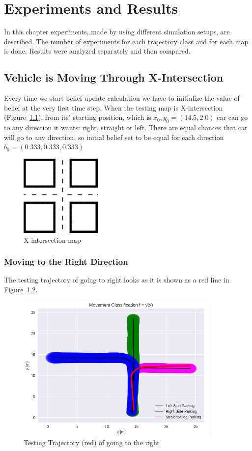 \chapter{Experiments and Results}
\label{chap:4}
%
In this chapter experiments, made by using different simulation setups, are described. The number of experiments for each trajectory class and for each map is done. Results were analyzed separately and then compared.

\section{Vehicle is Moving Through X-Intersection}

Every time we start belief update calculation we have to initialize the value of belief at the very first time step. When the testing map is X-intersection (Figure~\ref{fig:Xint}), from its' starting position, which is $x_0,y_0 = (14.5, 2.0)$ car can go to any direction it wants: right, straight or left. There are equal chances that car will go to any direction, so initial belief set to be equal for each direction $b_0 = (0.333, 0.333, 0.333)$

\begin{figure}[h]
	\centering  	
	\includegraphics[width=4cm]{img/X-int.jpg}
	\caption{X-intersection map}
	\label{fig:Xint}    
\end{figure}

\subsection{Moving to the Right Direction}

The testing trajectory of going to right looks as it is shown as a red line in Figure~\ref{fig:right}.

\begin{figure}[h]
	\centering  	
	\includegraphics[width=10cm]{img/right_org.jpg}
	\caption{Testing Trajectory (red) of going to the right}
	\label{fig:right}    
\end{figure}

